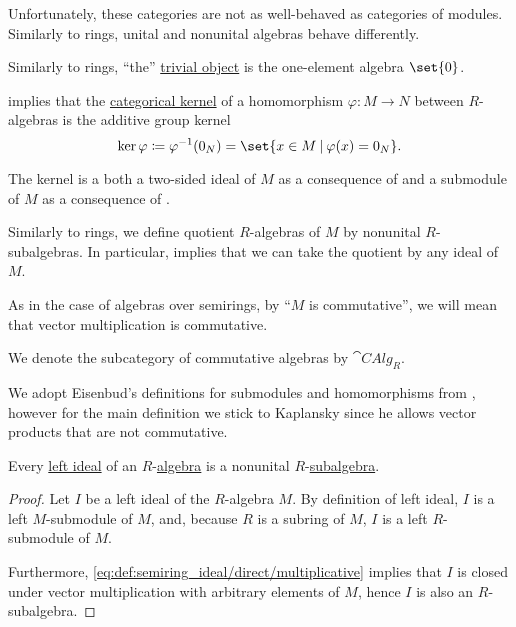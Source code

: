 \begin{definition}
\begin{thmenum}
    Unfortunately, these categories are not as well-behaved as categories of modules. Similarly to rings, unital and nonunital algebras behave differently.

    \mimprovised Similarly to rings, \enquote{the} \hyperref[def:trivial_object]{trivial object} is the one-element algebra \( \set{ 0 } \).

    \mimprovised {} implies that the \hyperref[def:zero_morphisms/kernel]{categorical kernel} of a homomorphism \( \varphi: M \to N \) between  \( R \)-algebras is the additive group kernel
    \begin{equation*}
      \ker \varphi \coloneqq \varphi^{-1}(0_N) = \set{ x \in M \given \varphi(x) = 0_N }.
    \end{equation*}

    The kernel is a both a two-sided ideal of \( M \) as a consequence of  and a submodule of \( M \) as a consequence of .

    \mimprovised Similarly to rings, we define quotient \( R \)-algebras of \( M \) by nonunital \( R \)-subalgebras. In particular,  implies that we can take the quotient by any ideal of \( M \).

    \mimprovised As in the case of algebras over semirings, by \enquote{\( M \) is commutative}, we will mean that vector multiplication is commutative.

    We denote the subcategory of commutative algebras by \( \cat{CAlg}_R \).
  \end{thmenum}
\end{definition}
\begin{comments}
  \item We adopt Eisenbud's definitions for submodules and homomorphisms from \cite[28]{Eisenbud1995CommAlgebra}, however for the main definition we stick to Kaplansky since he allows vector products that are not commutative.
\end{comments}

\begin{proposition}\label{thm:algebra_ideal_is_subalgebra}
  Every \hyperref[def:semiring_ideal]{left ideal} of an \( R \)-\hyperref[def:algebra_over_ring]{algebra} is a nonunital \( R \)-\hyperref[def:algebra_over_ring/submodel]{subalgebra}.
\end{proposition}
\begin{proof}
  Let \( I \) be a left ideal of the \( R \)-algebra \( M \). By definition of left ideal, \( I \) is a left \( M \)-submodule of \( M \), and, because \( R \) is a subring of \( M \), \( I \) is a left \( R \)-submodule of \( M \).

  Furthermore, \eqref{eq:def:semiring_ideal/direct/multiplicative} implies that \( I \) is closed under vector multiplication with arbitrary elements of \( M \), hence \( I \) is also an \( R \)-subalgebra.
\end{proof}


